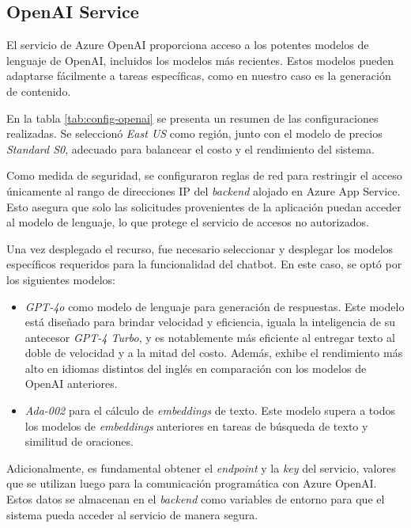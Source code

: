 \subsection{OpenAI Service}

El servicio de Azure OpenAI proporciona acceso a los potentes modelos de lenguaje de OpenAI, incluidos los modelos más recientes. 
Estos modelos pueden adaptarse fácilmente a tareas específicas, como en nuestro caso es la generación de contenido.

En la tabla \ref{tab:config-openai} se presenta un resumen de las configuraciones realizadas. 
Se seleccionó \textit{East US} como región, junto con el modelo de precios \textit{Standard S0}, 
adecuado para balancear el costo y el rendimiento del sistema.

Como medida de seguridad, se configuraron reglas de red para restringir el acceso únicamente al rango 
de direcciones IP del \textit{backend} alojado en Azure App Service. Esto asegura que solo las solicitudes provenientes de la 
aplicación puedan acceder al modelo de lenguaje, lo que protege el servicio de accesos no autorizados.

Una vez desplegado el recurso, fue necesario seleccionar y desplegar los modelos específicos requeridos para la funcionalidad del chatbot. 
En este caso, se optó por los siguientes modelos:

\begin{itemize}
	\item \textit{GPT-4o} como modelo de lenguaje para generación de respuestas. Este modelo está diseñado para brindar velocidad 
  y eficiencia, iguala la inteligencia de su antecesor \textit{GPT-4 Turbo}, y es notablemente más eficiente al entregar texto al 
  doble de velocidad y a la mitad del costo. Además, exhibe el rendimiento más alto en idiomas distintos del inglés en comparación 
  con los modelos de OpenAI anteriores.
	\item \textit{Ada-002} para el cálculo de \textit{embeddings} de texto. Este modelo supera a todos los modelos de \textit{embeddings} 
  anteriores en tareas de búsqueda de texto y similitud de oraciones.
\end{itemize}

Adicionalmente, es fundamental obtener el \textit{endpoint} y la \textit{key} del servicio, valores que se utilizan luego para la comunicación programática 
con Azure OpenAI. Estos datos se almacenan en el \textit{backend} como variables de entorno para que el sistema pueda acceder al servicio de manera segura.

